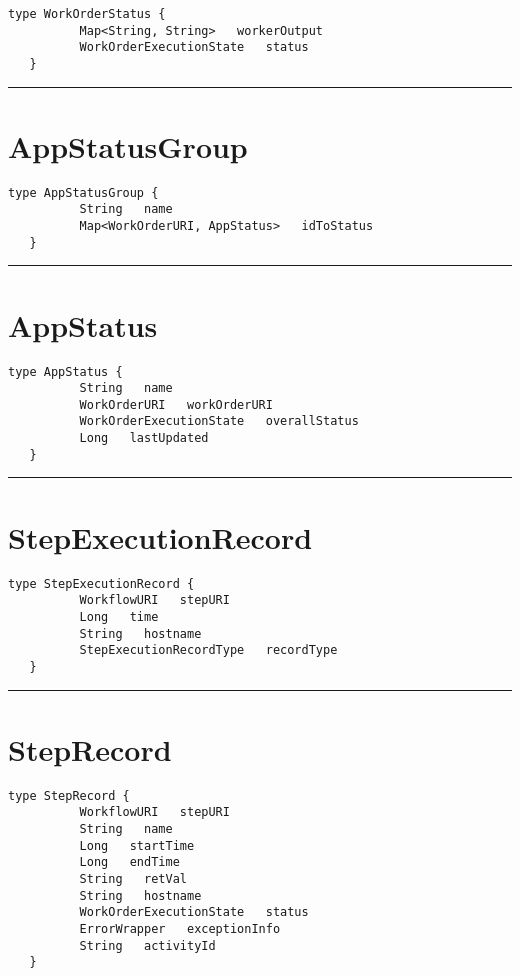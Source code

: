 \begin{lstlisting}[style=nonumbers]
   type WorkOrderStatus {
          Map<String, String>   workerOutput
          WorkOrderExecutionState   status
   }
\end{lstlisting}

\rule{12cm}{2pt}
\section{AppStatusGroup}
\label{type:AppStatusGroup}

\begin{lstlisting}[style=nonumbers]
   type AppStatusGroup {
          String   name
          Map<WorkOrderURI, AppStatus>   idToStatus
   }
\end{lstlisting}

\rule{12cm}{2pt}
\section{AppStatus}
\label{type:AppStatus}

\begin{lstlisting}[style=nonumbers]
   type AppStatus {
          String   name
          WorkOrderURI   workOrderURI
          WorkOrderExecutionState   overallStatus
          Long   lastUpdated
   }
\end{lstlisting}

\rule{12cm}{2pt}
\section{StepExecutionRecord}
\label{type:StepExecutionRecord}

\begin{lstlisting}[style=nonumbers]
   type StepExecutionRecord {
          WorkflowURI   stepURI
          Long   time
          String   hostname
          StepExecutionRecordType   recordType
   }
\end{lstlisting}

\rule{12cm}{2pt}
\section{StepRecord}
\label{type:StepRecord}

\begin{lstlisting}[style=nonumbers]
   type StepRecord {
          WorkflowURI   stepURI
          String   name
          Long   startTime
          Long   endTime
          String   retVal
          String   hostname
          WorkOrderExecutionState   status
          ErrorWrapper   exceptionInfo
          String   activityId
   }
\end{lstlisting}

